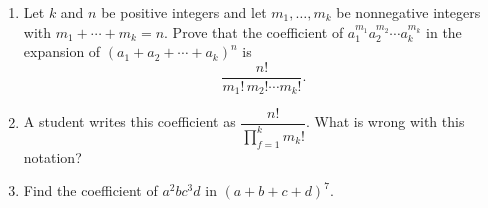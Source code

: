 \begin{enumerate}
\item[(a)] Let $k$ and $n$ be positive integers and let $m_1,\ldots,m_k$ be nonnegative integers with $m_1+\cdots+m_k=n$. Prove that the coefficient of $a_1^{m_1}a_2^{m_2}\cdots a_k^{m_k}$ in the expansion of $(a_1+a_2+\cdots+a_k)^n$ is
\[\dfrac{n!}{m_1!\,m_2!\cdots m_k!}.\]
\item[(b)] A student writes this coefficient as $\dfrac{n!}{\prod_{f=1}^k m_k!}$. What is wrong with this notation?
\item[(c)] Find the coefficient of $a^2bc^3d$ in $(a+b+c+d)^7$.
\end{enumerate}
